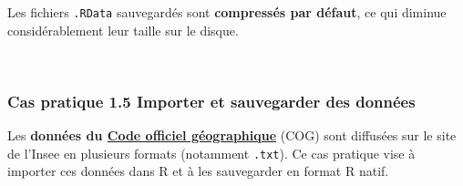 \documentclass[12pt,twosided, notitlepage]{book}
\begin{document}
Les fichiers \texttt{.RData} sauvegardés sont \textbf{compressés par
défaut}, ce qui diminue considérablement leur taille sur le disque.

~

\subsubsection{\texorpdfstring{\textbf{Cas pratique 1.5} Importer et
sauvegarder des
données}{Cas pratique 1.5 Importer et sauvegarder des données}}\label{cas-pratique-1.5-importer-et-sauvegarder-des-donnees}

Les \textbf{données du
\href{https://www.insee.fr/fr/information/2666684}{Code officiel
géographique}} (COG) sont diffusées sur le site de l'Insee en plusieurs
formats (notamment \texttt{.txt}). Ce cas pratique vise à importer ces
données dans R et à les sauvegarder en format R natif.
\end{document}
